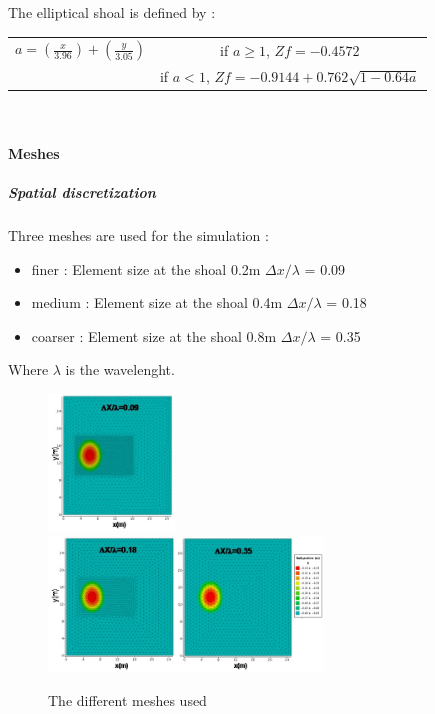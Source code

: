 \vspace{1cm}

The elliptical shoal is defined by :\\
\begin{center}

\begin{tabular}{c|c}
$a = (\frac{x}{3.96})+(\frac{y}{3.05})$ & if $a \geq 1$, $Zf = -0.4572$\\
 & if $a < 1$, $Zf = -0.9144+0.762 \sqrt{1-0.64a}$
\end{tabular}\\
\end{center}
\paragraph{Meshes}
\subparagraph{Spatial discretization}
Three meshes are used for the simulation :
\begin{itemize}
\item finer : Element size at the shoal 0.2m \quad $\Delta x/\lambda$ = 0.09
\item medium : Element size at the shoal 0.4m \quad $\Delta x/\lambda$ = 0.18
\item coarser : Element size at the shoal 0.8m \quad $\Delta x/\lambda$ = 0.35
\end{itemize}

Where $\lambda$ is the wavelenght.
\begin{figure}[h!]
  \centering
    \includegraphics[width=0.3\textwidth]{mesh009.jpg}\\
    \includegraphics[width=0.65\textwidth]{meshes018035.jpg}
      \caption{The different meshes used}
\end{figure}

